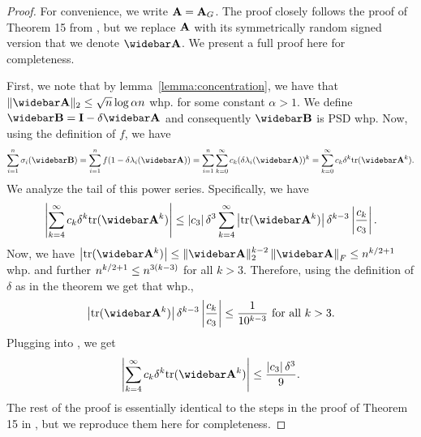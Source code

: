 \begin{proof}
For convenience, we write $\mathbf{A} = \mathbf{A}_G$. The proof closely follows the proof of Theorem 15 from \cite{musco2017spectrum}, but we replace $\mathbf{A}$ with its symmetrically random signed version that we denote $\As$. We present a full proof here for completeness.

First, we note that by lemma~\ref{lemma:concentration}, we have that $\norm{\As}_2 \leq \sqrt{n} \log{\alpha n}$ whp. for some constant $\alpha >1$. We define $\Bs = \I - \delta \As$ and consequently $\Bs$ is PSD whp. Now, using the definition of $f$, we have
    \begin{align*}
        \sum_{i=1}^n \sigma_i(\Bs) = \sum_{i=1}^n f(1 - \delta \lambda_i(\As)) = \sum_{i=1}^n \sum_{k=0}^\infty c_k (\delta \lambda_i(\As))^k = \sum_{k=0}^\infty c_k \delta^k \trace{\As^k}.
    \end{align*}
We analyze the tail of this power series. Specifically, we have 
\begin{align}\label{eq:thm15proof_powerseries_tail_bound}
    \abs{\sum_{k=4}^\infty  c_k \delta^k \trace{\As^k}} \leq \abs{c_3} \delta^3 \sum_{k=4}^\infty \abs{\trace{\As^k}} \delta^{k-3} \abs{\frac{c_k}{c_3}}.
\end{align}
Now, we have $\abs{\trace{\As^k}} \leq \norm{\As}^{k-2}_2 \normgen{\As}{F} \leq n^{k/2 + 1}$ whp. and further $n^{k/2 + 1} \leq n^{3\left( k-3 \right)}$ for all $k>3$. Therefore, using the definition of $\delta$ as in the theorem we get that whp.,
    \begin{align*}
        \abs{\trace{\As^k}} \delta^{k-3} \abs{\frac{c_k}{c_3}} \leq \frac{1}{10^{k-3}}\text{ for all } k>3.
    \end{align*}
Plugging into , we get 
\begin{align*}
    \abs{\sum_{k=4}^\infty  c_k \delta^k \trace{\As^k}} \leq \frac{\abs{c_3}\delta^3}{9}.
\end{align*}
The rest of the proof is essentially identical to the steps in the proof of Theorem 15 in \cite{musco2017spectrum}, but we reproduce them here for completeness.


\end{proof}
